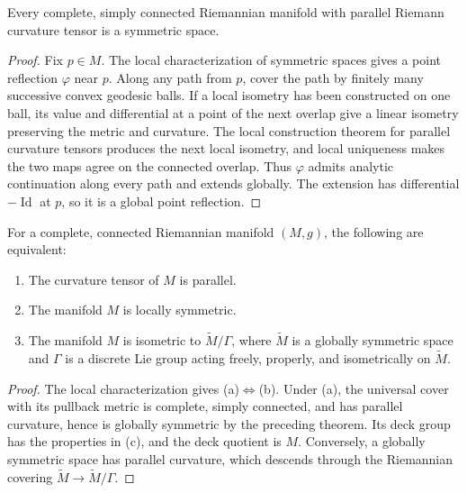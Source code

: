 \begin{theorem}
\label{thm:parallel-riemann-curvature-implies-symmetry}

Every complete, simply connected Riemannian manifold with parallel Riemann
curvature tensor is a symmetric space.
\begin{proof}
\sketch Fix $p\in M$.  The local characterization of symmetric spaces gives
a point reflection $\varphi$ near $p$.  Along any path from $p$, cover the
path by finitely many successive convex geodesic balls.  If a local isometry
has been constructed on one ball, its value and differential at a point of
the next overlap give a linear isometry preserving the metric and curvature.
The local construction theorem for parallel curvature tensors produces the
next local isometry, and local uniqueness makes the two maps agree on the
connected overlap.  Thus $\varphi$ admits analytic continuation along every
path and extends globally.  The extension has differential
$-\operatorname{Id}$ at $p$, so it is a global point reflection.
\end{proof}
\end{theorem}

\begin{corollary}
\label{cor:symmetric-space-equivalence}

For a complete, connected Riemannian manifold $(M,g)$, the following are
equivalent:
\begin{enumerate}
\item[(a)] The curvature tensor of $M$ is parallel.
\item[(b)] The manifold $M$ is locally symmetric.
\item[(c)] The manifold $M$ is isometric to $\widetilde M/\Gamma$, where
$\widetilde M$ is a globally symmetric space and $\Gamma$ is a discrete Lie
group acting freely, properly, and isometrically on $\widetilde M$.
\end{enumerate}
\begin{proof}
\sketch The local characterization gives (a)$\Leftrightarrow$(b).  Under (a),
the universal cover with its pullback metric is complete, simply connected,
and has parallel curvature, hence is globally symmetric by the preceding
theorem.  Its deck group has the properties in (c), and the deck quotient is
$M$.  Conversely, a globally symmetric space has parallel curvature, which
descends through the Riemannian covering $\widetilde M\to\widetilde M/\Gamma$.
\end{proof}
\end{corollary}

